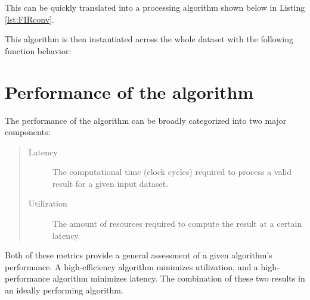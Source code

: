 \documentclass[11pt]{report}
\begin{document}
This can be quickly translated into a processing algorithm shown below in Listing \ref{lst:FIRconv}.

\begin{singlespace}
    
\end{singlespace}

This algorithm is then instantiated across the whole dataset with the following function behavior:

\begin{singlespace}
    
\end{singlespace}

\section{Performance of the algorithm}
The performance of the algorithm can be broadly categorized into two major components:

\begin{quote}
\begin{description}
	\item [Latency] The computational time (clock cycles) required to process a valid result for a given input dataset.
	\item [Utilization] The amount of resources required to compute the result at a certain latency.
\end{description}
\end{quote}

Both of these metrics provide a general assessment of a given algorithm's performance. A high-efficiency algorithm minimizes utilization, and a high-performance algorithm minimizes latency. The combination of these two results in an ideally performing algorithm.
\end{document}
